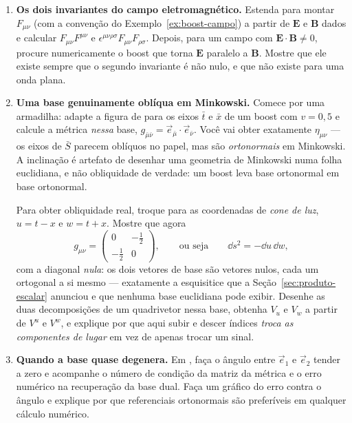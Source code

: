 \documentclass[12pt,a4paper,oneside]{book}
\theoremstyle{rgplain}
\theoremstyle{rgremark}
\begin{document}
\begin{enumerate}
  \item \textbf{Os dois invariantes do campo eletromagnético.} Estenda
 para montar $F_{\mu\nu}$ (com a convenção do
Exemplo~\ref{ex:boost-campo}) a partir de $\bm E$ e
$\bm B$ dados e calcular $F_{\mu\nu}F^{\mu\nu}$ e
$\epsilon^{\mu\nu\rho\sigma}F_{\mu\nu}F_{\rho\sigma}$. Depois, para um campo
com $\bm E\cdot\bm B\ne0$, procure numericamente o boost que torna $\bm E$
paralelo a $\bm B$. Mostre que ele existe sempre que o segundo invariante é
não nulo, e que não existe para uma onda plana.

  \item \textbf{Uma base genuinamente oblíqua em Minkowski.} Comece por uma
armadilha: adapte a figura de  para os eixos $\bar t$ e
$\bar x$ de um boost com $v=0{,}5$ e calcule a métrica \emph{nessa} base,
$g_{\bar\mu\bar\nu}=\vec e_{\bar\mu}\cdot\vec e_{\bar\nu}$. Você vai obter exatamente
$\eta_{\mu\nu}$ --- os eixos de $\bar S$ parecem oblíquos no papel, mas são
\emph{ortonormais} em Minkowski. A inclinação é artefato de desenhar uma
geometria de Minkowski numa folha euclidiana, e não obliquidade de verdade:
um boost leva base ortonormal em base ortonormal.

  Para obter obliquidade real, troque para as coordenadas de \emph{cone de
luz}, $u=t-x$ e $w=t+x$. Mostre que agora
\[
  g_{\mu\nu}=\begin{pmatrix}0&-\tfrac12\\[2pt]-\tfrac12&0\end{pmatrix},
  \qquad\text{ou seja}\qquad \dd s^2=-\dd u\,\dd w,
\]
com a diagonal \emph{nula}: os dois vetores de base são vetores nulos, cada
um ortogonal a si mesmo --- exatamente a esquisitice que a
Seção~\ref{sec:produto-escalar} anunciou e que nenhuma base euclidiana pode
exibir. Desenhe as duas decomposições de um quadrivetor nessa base, obtenha
$V_u$ e $V_w$ a partir de $V^u$ e $V^w$, e explique por que aqui subir e
descer índices \emph{troca as componentes de lugar} em vez de apenas trocar
um sinal.

  \item \textbf{Quando a base quase degenera.} Em , faça
o ângulo entre $\vec e_1$ e $\vec e_2$ tender a zero e acompanhe o número de
condição da matriz da métrica e o erro numérico na recuperação da base dual.
Faça um gráfico do erro contra o ângulo e explique por que referenciais
ortonormais são preferíveis em qualquer cálculo numérico.
\end{enumerate}
\end{document}
